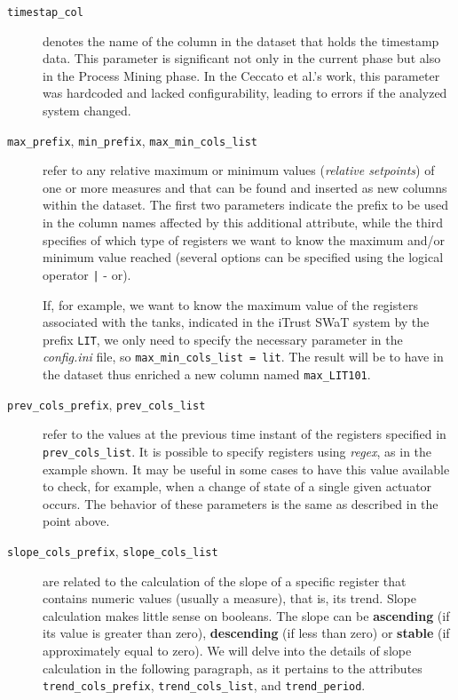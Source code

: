 \begin{description}
	\item[\texttt{timestap\_col}] denotes the name of the column in the dataset that holds the timestamp data. This parameter is significant not only in the current phase but also in the Process Mining phase. In the Ceccato et al.'s work, this parameter was hardcoded and lacked configurability, leading to errors if the analyzed system changed.
	
	\item[\texttt{max\_prefix}, \texttt{min\_prefix}, \texttt{max\_min\_cols\_list}] refer to any relative maximum or minimum values (\textit{relative setpoints}) of one or more measures and that can be found and inserted as new columns within the dataset. The first two parameters indicate the prefix to be used in the column names affected by this additional attribute, while the third specifies of which type of registers we want to know the maximum and/or minimum value reached (several options can be specified using the logical operator \texttt{|} - or).
	 
	If, for example, we want to know the maximum value of the registers associated with the tanks, indicated in the iTrust SWaT system by the prefix \texttt{LIT}, we only need to specify the necessary parameter in the \textit{config.ini} file, so \texttt{max\_min\_cols\_list = lit}.\newline
	The result will be to have in the dataset thus enriched a new column named \texttt{max\_LIT101}.
	
	\item[\texttt{prev\_cols\_prefix}, \texttt{prev\_cols\_list}]  refer to the values at the previous time instant of the registers specified in \texttt{prev\_cols\_list}. It is possible to specify registers using \textit{regex}, as in the example shown. It may be useful in some cases to have this value available to check, for example, when a change of state of a single given actuator occurs.  The behavior of these parameters is the same as described in the point above.
	
	\item[\texttt{slope\_cols\_prefix}, \texttt{slope\_cols\_list}] are related to the calculation of the slope of a specific register that contains numeric values (usually a measure), that is, its trend. Slope calculation makes little sense on booleans. The slope can be \textbf{ascending} (if its value is greater than zero), \textbf{descending} (if less than zero) or \textbf{stable} (if approximately equal to zero). We will delve into the details of slope calculation in the following paragraph, as it pertains to the attributes \texttt{trend\_cols\_prefix}, \texttt{trend\_cols\_list}, and \texttt{trend\_period}.
\end{description}


